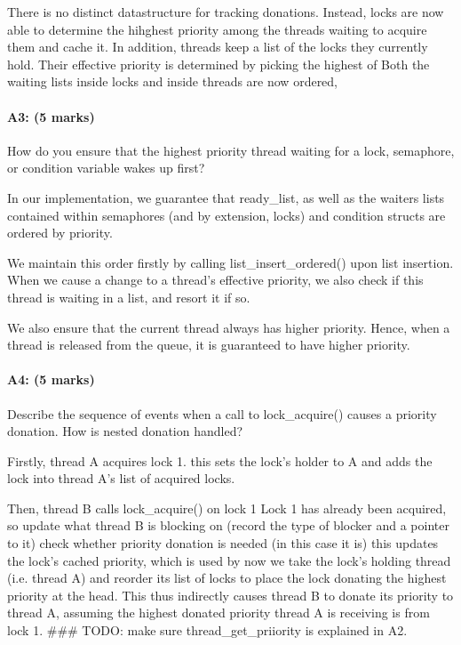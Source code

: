 There is no distinct datastructure for tracking donations.
Instead, locks are now able to determine the hihghest priority among the threads waiting to acquire them and cache it.
In addition, threads keep a list of the locks they currently hold. Their effective priority is determined by picking the highest of 
Both the waiting lists inside locks and inside threads are now ordered, 

\paragraph{A3: (5 marks)}
How do you ensure that the highest priority thread waiting for a lock, semaphore, or condition variable wakes up first?

In our implementation, we guarantee that ready_list, as well as the waiters lists contained within semaphores (and by extension, locks) and condition structs are ordered by priority.

We maintain this order firstly by calling list_insert_ordered() upon list insertion. When we cause a change to a thread's effective priority, we also check if this thread is waiting in a list, and resort it if so.

We also ensure that the current thread always has higher priority.
Hence, when a thread is released from the queue, it is guaranteed to have higher priority.

\paragraph{A4: (5 marks)}
Describe the sequence of events when a call to lock\_acquire() causes a priority donation.  How is nested donation handled?

  Firstly, thread A acquires lock 1.
    this sets the lock's holder to A and adds the lock into thread A's list of acquired locks.

  Then, thread B calls lock_acquire() on lock 1
  Lock 1 has already been acquired, so
    update what thread B is blocking on (record the type of blocker and a pointer to it)
    check whether priority donation is needed (in this case it is)
      this updates the lock's cached priority, which is used by 
    now we take the lock's holding thread (i.e. thread A) and reorder its list of locks to place the lock donating the highest priority at the head. This thus indirectly causes thread B to donate its priority to thread A, assuming the highest donated priority thread A is receiving is from lock 1.
    ### TODO: make sure thread_get_priiority is explained in A2.

